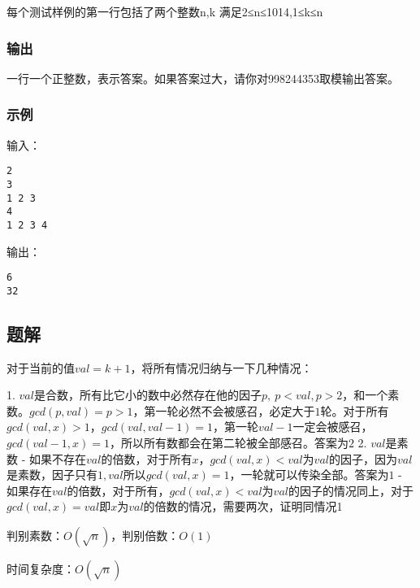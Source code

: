 每个测试样例的第一行包括了两个整数n,k 满足2≤n≤1014,1≤k≤n

\subsubsection{输出}
一行一个正整数，表示答案。如果答案过大，请你对998244353取模输出答案。

\subsubsection{示例}
输入：
\begin{lstlisting}
2
3
1 2 3
4
1 2 3 4
\end{lstlisting}

输出：
\begin{lstlisting}
6
32
\end{lstlisting}

\subsection{题解}

对于当前的值$val = k + 1$，将所有情况归纳与一下几种情况：

1. $val$是合数，所有比它小的数中必然存在他的因子$p, \ p < val, p > 2$，和一个素数。$gcd(p, val) = p > 1$，第一轮必然不会被感召，必定大于$1$轮。对于所有$gcd(val, x) > 1$，$gcd(val, val - 1) = 1$，第一轮$val - 1$一定会被感召，$gcd(val - 1, x) = 1$，所以所有数都会在第二轮被全部感召。答案为$2$
2. $val$是素数
   - 如果不存在$val$的倍数，对于所有$x$，$gcd(val, x)<val$为$val$的因子，因为$val$是素数，因子只有$1, val$所以$gcd(val, x) = 1$，一轮就可以传染全部。答案为$1$
   - 如果存在$val$的倍数，对于所有，$gcd(val, x)<val$为$val$的因子的情况同上，对于$gcd(val, x)=val$即$x$为$val$的倍数的情况，需要两次，证明同情况1​

判别素数：$O(\sqrt{n})$，判别倍数：$O(1)$

时间复杂度：$O(\sqrt{n})$

